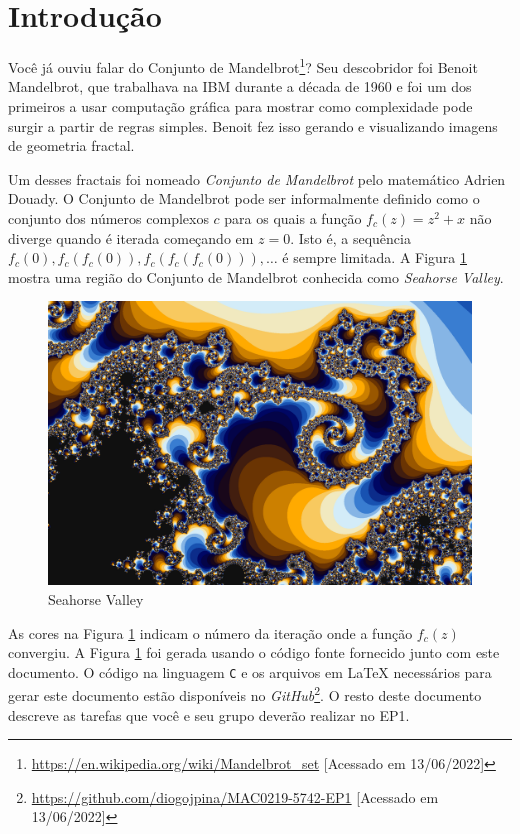 \documentclass[final,12pt,a4paper]{elsarticle}
\begin{document}

\section{Introdução}

Você já ouviu falar do Conjunto de
Mandelbrot\footnote{\url{https://en.wikipedia.org/wiki/Mandelbrot_set}
[Acessado em 13/06/2022]}?  Seu descobridor foi Benoit Mandelbrot, que
trabalhava na IBM durante a década de 1960 e foi um dos primeiros a usar
computação gráfica para mostrar como complexidade pode surgir a partir de
regras simples. Benoit fez isso gerando e visualizando imagens de geometria
fractal.

Um desses fractais  foi nomeado \textit{Conjunto de  Mandelbrot} pelo matemático
Adrien Douady.  O Conjunto de Mandelbrot  pode ser informalmente definido como o
conjunto dos números complexos $c$ para os quais a função $f_c(z) = z^2 + x$ não
diverge quando  é iterada  começando em $z  = 0$. Isto  é, a  sequência $f_c(0),
f_c(f_c(0)),    f_c(f_c(f_c(0))),\dots$   é    sempre    limitada.   A    Figura
\ref{fig:header}  mostra uma  região do  Conjunto de  Mandelbrot conhecida  como
\textit{Seahorse Valley}.

\begin{figure}[htpb]
    \centering
    \includegraphics[width=.82\textwidth]{seahorse}
    \caption{Seahorse Valley}
    \label{fig:header}
\end{figure}

As cores na Figura \ref{fig:header} indicam o número da iteração onde a
função $f_c(z)$ convergiu. A Figura \ref{fig:header} foi gerada usando o
código fonte fornecido junto com este documento. O código na linguagem
\texttt{C} e os arquivos em \LaTeX{} necessários para gerar este documento
estão disponíveis no
\textit{GitHub}\footnote{\url{https://github.com/diogojpina/MAC0219-5742-EP1}
[Acessado em 13/06/2022]}. O resto deste documento descreve as tarefas que você
e seu grupo deverão realizar no EP1.
\end{document}
